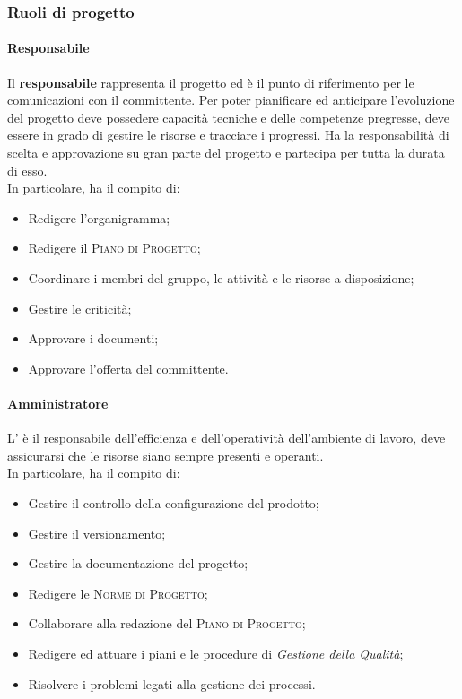 \subsubsection{Ruoli di progetto}

\paragraph{Responsabile}

Il \textbf{responsabile} rappresenta il progetto ed è il punto di riferimento per le comunicazioni con il committente. 
Per poter pianificare ed anticipare l'evoluzione del progetto deve possedere capacità tecniche e delle competenze 
pregresse, deve essere in grado di gestire le risorse e tracciare i progressi. Ha la responsabilità di scelta e 
approvazione su gran parte del progetto e partecipa per tutta la durata di esso.\\
In particolare, ha il compito di:
\begin{itemize}
    \item Redigere l'organigramma;
    \item Redigere il \textsc{Piano di Progetto};
    \item Coordinare i membri del gruppo, le attività e le risorse a disposizione;
    \item Gestire le criticità;
    \item Approvare i documenti;
    \item Approvare l'offerta del committente.
\end{itemize}

\paragraph{Amministratore}

L'\textbf{} è il responsabile dell'efficienza e dell'operatività dell'ambiente di lavoro, 
deve assicurarsi che le risorse siano sempre presenti e operanti.\\
In particolare, ha il compito di:
\begin{itemize}
    \item Gestire il controllo della configurazione del prodotto;
    \item Gestire il versionamento;
    \item Gestire la documentazione del progetto;
    \item Redigere le \textsc{Norme di Progetto};
    \item Collaborare alla redazione del \textsc{Piano di Progetto};
    \item Redigere ed attuare i piani e le procedure di \emph{Gestione della Qualità};
    \item Risolvere i problemi legati alla gestione dei processi.
\end{itemize}
    
